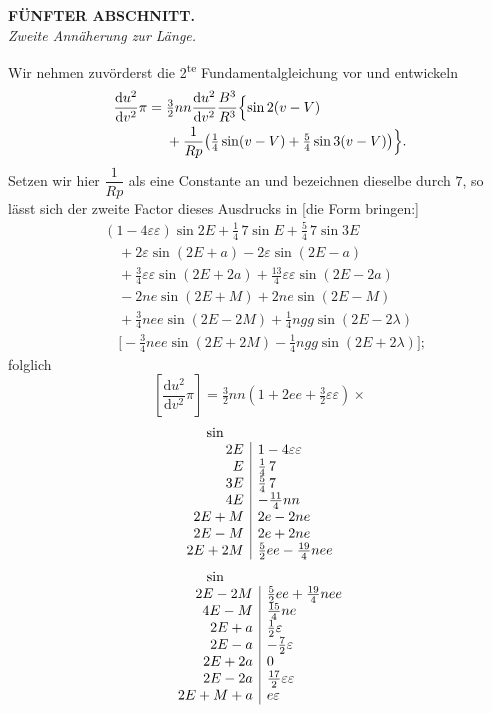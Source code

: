 \clearpage
\begingroup
{}
\renewcommand{\headrulewidth}{0pt}
\begin{center}
\textbf{FÜNFTER ABSCHNITT.}\\[8pt]
\textit{Zweite Annäherung zur Länge.}
\end{center}
\par\noindent\hspace*{\parindent}Wir nehmen zuvörderst die 2\textsuperscript{te} Fundamentalgleichung vor und entwickeln
\[
\begin{aligned}
\frac{\mathrm du^2}{\mathrm dv^2}\pi
={}&\tfrac32nn\frac{\mathrm du^2}{\mathrm dv^2}\frac{B^3}{R^3}
\Bigl\{\sin2(v-V)\\
&+\frac{1}{Rp}\bigl(\tfrac14\sin(v-V)+\tfrac54\sin3(v-V)\bigr)\Bigr\}.
\end{aligned}
\]
\noindent Setzen wir hier \(\dfrac{1}{Rp}\) als eine Constante an und bezeichnen dieselbe durch \(7\),
so lässt sich der zweite Factor dieses Ausdrucks in [die Form bringen:]
\[
\begin{aligned}
&(1-4\varepsilon\varepsilon)\sin2E+\tfrac14\,7\sin E+\tfrac54\,7\sin3E\\
&\quad+2\varepsilon\sin(2E+a)-2\varepsilon\sin(2E-a)\\
&\quad+\tfrac34\varepsilon\varepsilon\sin(2E+2a)+\tfrac{13}{4}\varepsilon\varepsilon\sin(2E-2a)\\
&\quad-2ne\sin(2E+M)+2ne\sin(2E-M)\\
&\quad+\tfrac34nee\sin(2E-2M)+\tfrac14ngg\sin(2E-2\lambda)\\
&\quad\bigl[-\tfrac34nee\sin(2E+2M)-\tfrac14ngg\sin(2E+2\lambda)\bigr];
\end{aligned}
\]
\noindent folglich
\[
\left[\frac{\mathrm du^2}{\mathrm dv^2}\pi\right]
=\tfrac32nn(1+2ee+\tfrac32\varepsilon\varepsilon)\times
\]
\[
\begin{array}{r|l}
\multicolumn{1}{c}{\sin}&\\
2E&1-4\varepsilon\varepsilon\\
E&\tfrac14\,7\\
3E&\tfrac54\,7\\
4E&-\tfrac{11}{4}nn\\
2E+M&2e-2ne\\
2E-M&2e+2ne\\
2E+2M&\tfrac52ee-\tfrac{19}{4}nee
\end{array}
\]
\[
\begin{array}{r|l}
\multicolumn{1}{c}{\sin}&\\
2E-2M&\tfrac52ee+\tfrac{19}{4}nee\\
4E-M&\tfrac{15}{4}ne\\
2E+a&\tfrac12\varepsilon\\
2E-a&-\tfrac72\varepsilon\\
2E+2a&0\\
2E-2a&\tfrac{17}{2}\varepsilon\varepsilon\\
2E+M+a&e\varepsilon
\end{array}
\]
